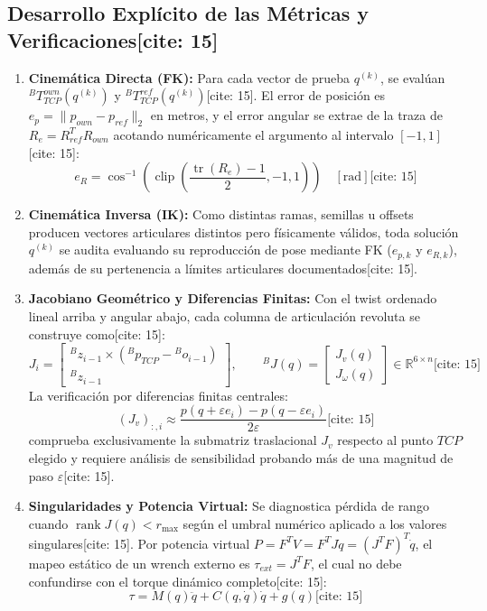 \documentclass[11pt, a4paper]{article}
\begin{document}
\subsection{Desarrollo Explícito de las Métricas y Verificaciones[cite: 15]}
\begin{enumerate}
    \item \textbf{Cinemática Directa (FK):} Para cada vector de prueba $q^{(k)}$, se evalúan ${}^BT_{TCP}^{own}(q^{(k)})$ y ${}^BT_{TCP}^{ref}(q^{(k)})$[cite: 15]. El error de posición es $e_p = \|p_{own}-p_{ref}\|_2$ en metros, y el error angular se extrae de la traza de $R_e = R_{ref}^T R_{own}$ acotando numéricamente el argumento al intervalo $[-1, 1]$[cite: 15]:
    \begin{equation}
        e_R = \cos^{-1}\!\left(\operatorname{clip}\!\left(\frac{\operatorname{tr}(R_e)-1}{2}, -1, 1\right)\right) \quad [\mathrm{rad}] \text{[cite: 15]}
    \end{equation}
    \item \textbf{Cinemática Inversa (IK):} Como distintas ramas, semillas u offsets producen vectores articulares distintos pero físicamente válidos, toda solución $q^{(k)}$ se audita evaluando su reproducción de pose mediante FK ($e_{p,k}$ y $e_{R,k}$), además de su pertenencia a límites articulares documentados[cite: 15].
    \item \textbf{Jacobiano Geométrico y Diferencias Finitas:} Con el twist ordenado lineal arriba y angular abajo, cada columna de articulación revoluta se construye como[cite: 15]:
    \begin{equation}
        J_i = \begin{bmatrix} {}^Bz_{i-1} \times ({}^Bp_{TCP} - {}^Bo_{i-1}) \\ {}^Bz_{i-1} \end{bmatrix}, \qquad {}^BJ(q) = \begin{bmatrix} J_v(q) \\ J_\omega(q) \end{bmatrix} \in \mathbb{R}^{6 \times n} \text{[cite: 15]}
    \end{equation}
    La verificación por diferencias finitas centrales:
    \begin{equation}
        (J_v)_{:,i} \approx \frac{p(q + \varepsilon e_i) - p(q - \varepsilon e_i)}{2\varepsilon} \text{[cite: 15]}
    \end{equation}
    comprueba exclusivamente la submatriz traslacional $J_v$ respecto al punto $TCP$ elegido y requiere análisis de sensibilidad probando más de una magnitud de paso $\varepsilon$[cite: 15].
    \item \textbf{Singularidades y Potencia Virtual:} Se diagnostica pérdida de rango cuando $\operatorname{rank}J(q) < r_{\max}$ según el umbral numérico aplicado a los valores singulares[cite: 15]. Por potencia virtual $P = F^T V = F^T J\dot{q} = (J^T F)^T \dot{q}$, el mapeo estático de un wrench externo es $\tau_{ext} = J^T F$, el cual no debe confundirse con el torque dinámico completo[cite: 15]:
    \begin{equation}
        \tau = M(q)\ddot{q} + C(q,\dot{q})\dot{q} + g(q) \text{[cite: 15]}
    \end{equation}
\end{enumerate}
\end{document}
